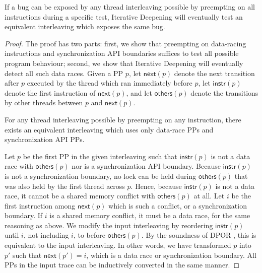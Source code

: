 \newcommand\ppnext[1]{\ensuremath{\mathsf{next}(#1)}}
\newcommand\ppinstr[1]{\ensuremath{\mathsf{instr}(#1)}}
\newcommand\ppothers[1]{\ensuremath{\mathsf{others}(#1)}}
\begin{theorem}[Convergence]
If a bug can be exposed by any thread interleaving possible by preempting on all instructions during a specific test,
Iterative Deepening will eventually test an equivalent interleaving which exposes the same bug.
	\label{thm:convergence}
\end{theorem}
\begin{proof}
The proof has two parts:
first, we show that preempting on data-racing instructions and synchronization API boundaries suffices to test all possible program behaviour;
second, we show that Iterative Deepening will eventually detect all such data races.
Given a PP $p$, let $\ppnext{p}$ denote the next transition after $p$ executed by the thread which ran immediately before $p$,
let $\ppinstr{p}$ denote the first instruction of $\ppnext{p}$,
and let $\ppothers{p}$ denote the transitions by other threads between $p$ and $\ppnext{p}$.

\begin{lemma}
For any thread interleaving possible by preempting on any instruction,
there exists an equivalent interleaving which uses only data-race PPs and synchronization API PPs.
	\label{lem:relevant}
\end{lemma}

Let $p$ be the first PP in the given interleaving such that $\ppinstr{p}$ is not a data race with $\ppothers{p}$ nor is a synchronization API boundary.
Because $\ppinstr{p}$ is not a synchronization boundary,
no lock can be held during $\ppothers{p}$ that was also held by the first thread across $p$.
Hence, because $\ppinstr{p}$ is not a data race, it cannot be a shared memory conflict with $\ppothers{p}$ at all.
Let $i$ be the first instruction among $\ppnext{p}$ which is such a conflict, or a synchronization boundary.
If $i$ is a shared memory conflict, it must be a data race, for the same reasoning as above.
We modify the input interleaving by reordering $\ppinstr{p}$ until $i$, not including $i$, to before $\ppothers{p}$.
By the soundness of DPOR \cite{dpor}, this is equivalent to the input interleaving.
In other words, we have transformed $p$ into $p'$ such that $\ppnext{p'} = i$, which is a data race or synchronization boundary.
All PPs in the input trace can be inductively converted in the same manner.


\end{proof}
